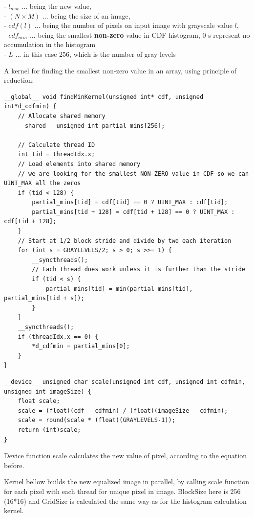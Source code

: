 \documentclass[10pt]{article}
\begin{document}
- $l_{new}$ ... being the new value,\\ - $(N \times M)$ ... being the size of an image,\\ - $cdf(l)$ ... being the number of pixels on input image with grayscale value $l$, \\ - $cdf_{min}$ ... being the smallest \textbf{non-zero} value in CDF histogram, 0-s represent no accumulation in the histogram\\ 
- $L$  ... in this case 256, which is the number of gray levels

\vspace{0.3cm}

A kernel for finding the smallest non-zero value in an array, using principle of reduction:\\
\begin{lstlisting}[style=cppstyle]
__global__ void findMinKernel(unsigned int* cdf, unsigned int*d_cdfmin) {
    // Allocate shared memory
	__shared__ unsigned int partial_mins[256];

	// Calculate thread ID
	int tid = threadIdx.x;
    // Load elements into shared memory
    // we are looking for the smallest NON-ZERO value in CDF so we can UINT_MAX all the zeros
    if (tid < 128) {
	    partial_mins[tid] = cdf[tid] == 0 ? UINT_MAX : cdf[tid];
        partial_mins[tid + 128] = cdf[tid + 128] == 0 ? UINT_MAX : cdf[tid + 128];
    }   
    // Start at 1/2 block stride and divide by two each iteration
	for (int s = GRAYLEVELS/2; s > 0; s >>= 1) {
        __syncthreads();
		// Each thread does work unless it is further than the stride
		if (tid < s) {
		    partial_mins[tid] = min(partial_mins[tid], partial_mins[tid + s]); 
	    }
	}
    __syncthreads();
	if (threadIdx.x == 0) {
        *d_cdfmin = partial_mins[0];
	}
}
\end{lstlisting}


\begin{lstlisting}[style=cppstyle]
__device__ unsigned char scale(unsigned int cdf, unsigned int cdfmin, unsigned int imageSize) {
    float scale;
    scale = (float)(cdf - cdfmin) / (float)(imageSize - cdfmin);
    scale = round(scale * (float)(GRAYLEVELS-1));
    return (int)scale;
}
\end{lstlisting}
Device function scale calculates the new value of pixel, according to the equation before.


\pagebreak
 
Kernel bellow builds the new equalized image in parallel, by calling scale function for each pixel with each thread for unique pixel in image. 
BlockSize here is 256 (16*16) and GridSize is calculated the same way as for the histogram calculation kernel.
\end{document}
